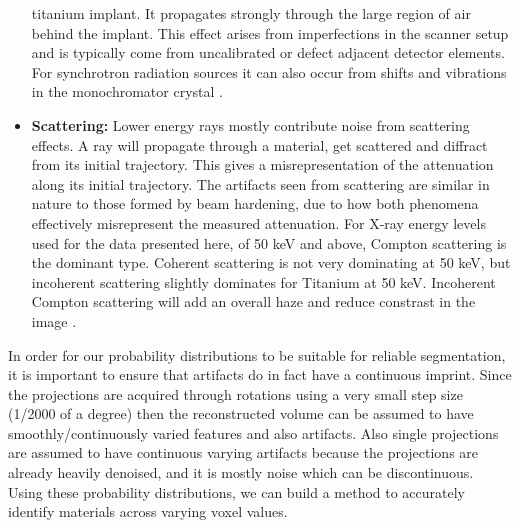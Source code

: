 \begin{itemize}
		titanium implant. It propagates strongly through the large
		region of air behind the implant. This effect arises from
		imperfections in the scanner setup and is typically come from
		uncalibrated or defect adjacent detector elements. For
		synchrotron radiation sources it can also occur from shifts and
		vibrations in the monochromator crystal \citep{ringartefacts}.
  \item \textbf{Scattering:} Lower energy rays mostly contribute noise from
	  scattering effects. A ray will propagate through a material, get
		scattered and diffract from its initial trajectory. This gives
		a misrepresentation of the attenuation along its initial
		trajectory. The artifacts seen from scattering are similar in
		nature to those formed by beam hardening, due to how both
		phenomena effectively misrepresent the measured attenuation.
		For X-ray energy levels used for the data presented here, of 50
		keV and above, Compton scattering is the dominant type.
		Coherent scattering is not very dominating at 50 keV, but
		incoherent scattering slightly dominates for Titanium at 50
		keV. Incoherent Compton scattering will add an overall haze and
		reduce constrast in the image
		\citep{Compton}\citep{xray-attenuation-10-kev-100-mev}\citep{attenuation-cross-sections}.
\end{itemize}

In order for our probability distributions to be suitable for reliable
segmentation,  it is important to ensure that artifacts do in fact have a
continuous imprint.  Since the projections are acquired through rotations using
a very small step size (1/2000 of a degree) then the reconstructed volume can
be assumed to have smoothly/continuously varied features and also artifacts.
Also single projections are assumed to have continuous varying artifacts
because the projections are already heavily denoised, and it is mostly noise
which can be discontinuous. Using these probability distributions, we can build
a method to accurately identify materials across varying voxel values.


